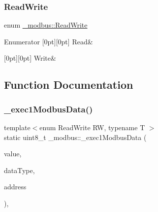 \subsubsection{\texorpdfstring{Read\+Write}{ReadWrite}}
{\footnotesize\ttfamily enum \hyperlink{namespace__modbus_af31b6a334c948fe83fa3f72d3d5f4f61}{\+\_\+modbus\+::\+Read\+Write}}

\begin{DoxyEnumFields}{Enumerator}
[0pt][0pt]{}\hypertarget{namespace__modbus_af31b6a334c948fe83fa3f72d3d5f4f61af1c5e1032d33319b26a1aa0e8ad3ee6d}{}\label{namespace__modbus_af31b6a334c948fe83fa3f72d3d5f4f61af1c5e1032d33319b26a1aa0e8ad3ee6d} 
Read&\\
\hline

[0pt][0pt]{}\hypertarget{namespace__modbus_af31b6a334c948fe83fa3f72d3d5f4f61a2d654b4fcb31a6f8fa8d9f532067abfd}{}\label{namespace__modbus_af31b6a334c948fe83fa3f72d3d5f4f61a2d654b4fcb31a6f8fa8d9f532067abfd} 
Write&\\
\hline

\end{DoxyEnumFields}


\subsection{Function Documentation}
\hypertarget{namespace__modbus_a7f7adbe09d891d89aef2766be0f3f67e}{}\label{namespace__modbus_a7f7adbe09d891d89aef2766be0f3f67e} 
\subsubsection{\texorpdfstring{\+\_\+exec1\+Modbus\+Data()}{\_exec1ModbusData()}}
{\footnotesize\ttfamily template$<$enum Read\+Write RW, typename T $>$ \\
static uint8\+\_\+t \+\_\+modbus\+::\+\_\+exec1\+Modbus\+Data (\begin{DoxyParamCaption}\item[{uint16\+\_\+t \&}]{value,  }\item[{const enum \hyperlink{namespace__modbus_a85902c8bc1ff424855dad072259df913}{Data\+Type} \&}]{data\+Type,  }\item[{const uint16\+\_\+t \&}]{address }\end{DoxyParamCaption})\hspace{0.3cm}{\ttfamily [inline]}, {\ttfamily [static]}}

